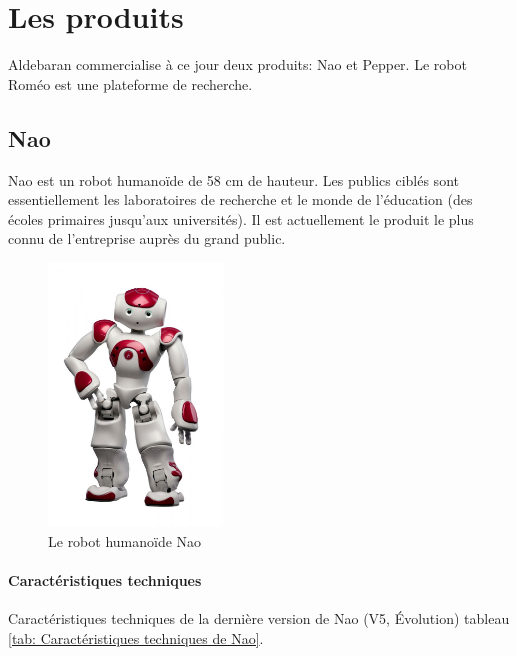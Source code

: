 \section{Les produits}
\label{Entreprise: Les produits}
Aldebaran commercialise à ce jour deux produits: Nao et Pepper. Le robot Roméo est une plateforme de recherche. 

\subsection{Nao}
\label{Entreprise: Les produits: Nao}
Nao est un robot humanoïde de 58 cm de hauteur. Les publics ciblés sont essentiellement les laboratoires de recherche et le monde de l'éducation (des écoles primaires jusqu'aux universités). Il est actuellement le produit le plus connu de l'entreprise auprès du grand public. 

\begin{figure}[H]
	\centering\includegraphics[height=7cm]{images/nao.jpg}
	\caption{Le robot humanoïde Nao}
	\label{fig:Robot humanoïde Nao}
\end{figure}

\paragraph{Caractéristiques techniques}
\label{Entreprise:Les produits: Nao: Caractéristiques techniques}
Caractéristiques techniques de la dernière version de Nao (V5, Évolution) tableau \ref{tab: Caractéristiques techniques de Nao}.

